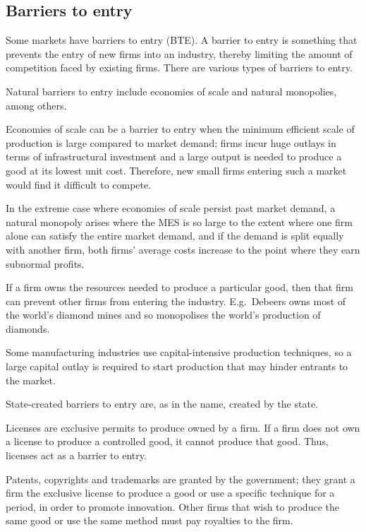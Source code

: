 \documentclass[Economics.tex]{subfiles}
\begin{document}
\subsection{Barriers to entry}
Some markets have barriers to entry (BTE). A barrier to entry is something that prevents the entry of new firms into an industry, thereby limiting the amount of competition faced by existing firms. There are various types of barriers to entry.

Natural barriers to entry include economies of scale and natural monopolies, among others.

Economies of scale can be a barrier to entry when the minimum efficient scale of production is large compared to market demand; firms incur huge outlays in terms of infrastructural investment and a large output is needed to produce a good at its lowest unit cost. Therefore, new small firms entering such a market would find it difficult to compete.

In the extreme case where economies of scale persist past market demand, a natural monopoly arises where the MES is so large to the extent where one firm alone can satisfy the entire market demand, and if the demand is split equally with another firm, both firms' average costs increase to the point where they earn subnormal profits.

If a firm owns the resources needed to produce a particular good, then that firm can prevent other firms from entering the industry. E.g.\ Debeers owns most of the world's diamond mines and so monopolises the world's production of diamonds.

Some manufacturing industries use capital-intensive production techniques, so a large capital outlay is required to start production that may hinder entrants to the market.

State-created barriers to entry are, as in the name, created by the state.

Licenses are exclusive permits to produce owned by a firm. If a firm does not own a license to produce a controlled good, it cannot produce that good. Thus, licenses act as a barrier to entry.

Patents, copyrights and trademarks are granted by the government; they grant a firm the exclusive license to produce a good or use a specific technique for a period, in order to promote innovation. Other firms that wish to produce the same good or use the same method must pay royalties to the firm.
\end{document}
